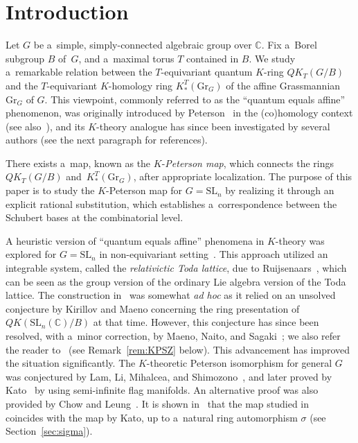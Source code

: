 \documentclass[pdftex]{sigma}
\numberwithin{equation}{section}
\newcommand{\C}{\mathbb{C}}
\newcommand{\Gr}{\mathrm{Gr}}
\newcommand{\SL}{\mathrm{SL}}
\theoremstyle{definition}
\begin{document}


\vspace{-2mm}

\section{Introduction}

Let $G$ be a~simple, simply-connected algebraic group over $\C$. Fix a~Borel subgroup $B$ of~$G$, and a~maximal torus $T$ contained in $B$.
We study a~remarkable relation
between the $T$\nobreakdash-equivariant
 quantum $K$-ring $QK_T(G/B)$
and
the $T$-equivariant $K$-homology ring
$K_*^T(\Gr_G)$ of the affine Grassmannian $\Gr_G$ of $G$.
This viewpoint, commonly referred to as the ``quantum equals affine'' phenomenon, was originally introduced by
Peterson~\cite{Pet} in the (co)homology context (see also~\cite{LS:Acta}),
and its $K$-theory analogue
has since been investigated by several authors (see the next paragraph for references).

There exists a~map, known as the $K$-\emph{Peterson map}, which connects the rings
$QK_T(G/B)$ and~$K_*^T(\Gr_G)$, after appropriate localization.
The purpose of this paper is
to study the $K$\nobreakdash-Pe\-ter\-son map for $G=\SL_n$ by realizing it through an explicit rational substitution, which establishes a~correspondence between the Schubert bases
at the combinatorial level.

A heuristic version of ``quantum equals affine'' phenomena in $K$-theory was explored for $G=\SL_n$
in non-equivariant setting~\cite{IIM}. This approach utilized
an integrable system, called the \emph{relativictic Toda lattice}, due to Ruijsenaars~\cite{Rui}, which
can be seen as the group version of the ordinary
Lie algebra version of the Toda lattice.
The construction
in~\cite{IIM}
was somewhat \emph{ad hoc} as it relied on an unsolved conjecture by
Kirillov and Maeno concerning the ring presentation of
$QK(\SL_n(\C)/B)$ at that time.
However, this conjecture has since been resolved, with a~minor correction, by Maeno, Naito, and Sagaki~\cite{MNS1}; we also refer the reader to~\cite{ACT,HK,Kim,KPSZ} (see Remark~\ref{rem:KPSZ} below). This advancement has improved the situation significantly.
The $K$-theoretic Peterson isomorphism
for general $G$ was conjectured by Lam, Li, Mihalcea, and Shimozono~\cite{LLMS}, and later proved by Kato~\cite{Kato} by using semi-infinite flag manifolds.
An alternative proof was also provided by Chow and Leung~\cite{CL}.
It is shown in~\cite{IIN} that the map studied in~\cite{IIM} coincides with the
map by Kato, up to a~natural ring automorphism
$\sigma$ (see Section~\ref{sec:sigma}).
\end{document}
